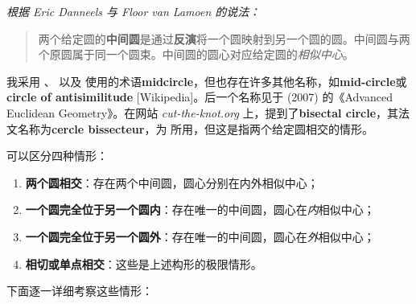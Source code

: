 \medskip

\emph{根据 Eric Danneels 与 Floor van Lamoen 的说法：}

\begin{quote}
两个给定圆的\textbf{中间圆}是通过\textbf{反演}将一个圆映射到另一个圆的圆。中间圆与两个原圆属于同一个圆束。中间圆的圆心对应给定圆的\emph{相似中心}。
\end{quote}

我采用 、 以及  使用的术语\textbf{midcircle}，但也存在许多其他名称，如\textbf{mid-circle}或\textbf{circle of antisimilitude} [Wikipedia]。后一个名称见于  (2007) 的《Advanced Euclidean Geometry》。在网站 \textit{cut-the-knot.org} 上，提到了\textbf{bisectal circle}，其法文名称为\textbf{cercle bissecteur}，为  所用，但这是指两个给定圆相交的情形。


可以区分四种情形：

\begin{enumerate}[label=(\roman*)]
  \item \textbf{两个圆相交}：存在两个中间圆，圆心分别在内外相似中心；
  \item \textbf{一个圆完全位于另一个圆内}：存在唯一的中间圆，圆心在\emph{内}相似中心；
  \item \textbf{一个圆完全位于另一个圆外}：存在唯一的中间圆，圆心在\emph{外}相似中心；
  \item \textbf{相切或单点相交}：这些是上述构形的极限情形。
\end{enumerate}


\vspace{1em}
下面逐一详细考察这些情形：

